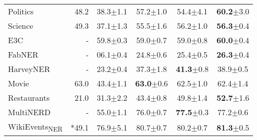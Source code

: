 \begin{table}
{\begin{tabular}{l|r|cc|cc}
            Politics & \citep{DBLP:journals/corr/abs-2304-08085} 48.2 & 38.3${\scriptscriptstyle\pm}$\tiny{1.1} & 57.2${\scriptscriptstyle\pm}$\tiny{1.0} & 54.4${\scriptscriptstyle\pm}$\tiny{4.1} & \textbf{60.2}${\scriptscriptstyle\pm}$\tiny{3.0} \\
            
            Science & \citep{DBLP:journals/corr/abs-2304-08085} 49.3 & 37.1${\scriptscriptstyle\pm}$\tiny{1.3} & 55.5${\scriptscriptstyle\pm}$\tiny{1.6} & 56.2${\scriptscriptstyle\pm}$\tiny{1.0} & \textbf{56.3}${\scriptscriptstyle\pm}$\tiny{0.4} \\
            
            E3C & - & 59.8${\scriptscriptstyle\pm}$\tiny{0.3} & 59.0${\scriptscriptstyle\pm}$\tiny{0.7} & 59.0${\scriptscriptstyle\pm}$\tiny{0.8} & \textbf{60.0}${\scriptscriptstyle\pm}$\tiny{0.4} \\
            
            FabNER & - & 06.1${\scriptscriptstyle\pm}$\tiny{0.4} & 24.8${\scriptscriptstyle\pm}$\tiny{0.6} & 25.4${\scriptscriptstyle\pm}$\tiny{0.5} & \textbf{26.3}${\scriptscriptstyle\pm}$\tiny{0.4} \\
            
            HarveyNER & - & 23.2${\scriptscriptstyle\pm}$\tiny{0.4} & 37.3${\scriptscriptstyle\pm}$\tiny{1.8} & \textbf{41.3}${\scriptscriptstyle\pm}$\tiny{0.8} & 38.9${\scriptscriptstyle\pm}$\tiny{0.5} \\
            
            Movie & \citep{DBLP:journals/corr/abs-2304-08085} 63.0 & 43.4${\scriptscriptstyle\pm}$\tiny{1.1} & \textbf{63.0}${\scriptscriptstyle\pm}$\tiny{0.6} & 62.5${\scriptscriptstyle\pm}$\tiny{1.0} & 62.4${\scriptscriptstyle\pm}$\tiny{1.4} \\
            
            Restaurants & \citep{DBLP:journals/corr/abs-2304-08085} 21.0 & 31.3${\scriptscriptstyle\pm}$\tiny{2.2}  & 43.4${\scriptscriptstyle\pm}$\tiny{0.8} & 49.8${\scriptscriptstyle\pm}$\tiny{1.4} & \textbf{52.7}${\scriptscriptstyle\pm}$\tiny{1.6} \\
            
            MultiNERD & - & 55.0${\scriptscriptstyle\pm}$\tiny{1.1} & 76.0${\scriptscriptstyle\pm}$\tiny{0.7} & \textbf{77.5}${\scriptscriptstyle\pm}$\tiny{0.3} & 77.2${\scriptscriptstyle\pm}$\tiny{0.6} \\
            
            WikiEvents\textsubscript{NER} & \citep{sainz-etal-2022-zs4ie} *49.1 & 76.9${\scriptscriptstyle\pm}$\tiny{5.1} & 80.7${\scriptscriptstyle\pm}$\tiny{0.7} & 80.2${\scriptscriptstyle\pm}$\tiny{0.7} & \textbf{81.3}${\scriptscriptstyle\pm}$\tiny{0.5} \\
            

\end{tabular}}
\end{table}
